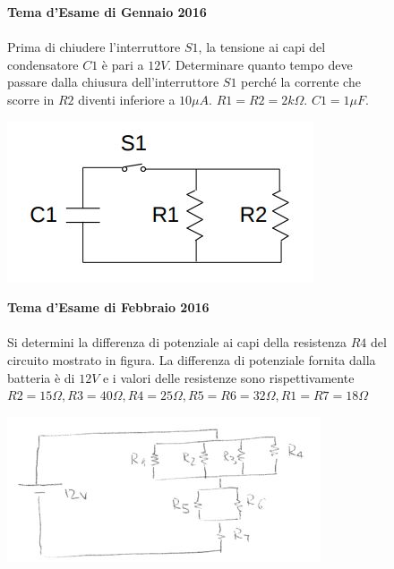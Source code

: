 \begin{figure}[h!]
\textbf{Tema d'Esame di Gennaio 2016}\\ \\
 Prima di chiudere l'interruttore $S1$, la tensione ai capi del condensatore $C1$ è pari a $12V$. Determinare quanto tempo deve passare dalla chiusura dell'interruttore $S1$ perché la corrente
che scorre in $R2$ diventi inferiore a $10 \mu A$. $R1=R2=2k\Omega$. $C1=1\mu F$.
\begin{center}
		\includegraphics[scale=0.8]{ES5/GEN052016.jpg}
	\end{center}
\end{figure}

\begin{figure}[h!]
\textbf{Tema d'Esame di Febbraio 2016}\\ \\
Si determini la differenza di potenziale ai capi della resistenza $R4$ del circuito mostrato in figura. La differenza di potenziale fornita dalla batteria è di $12V$ e i valori delle resistenze sono rispettivamente $R2=15\Omega, R3=40\Omega,R4=25\Omega, R5=R6=32\Omega, R1=R7=18\Omega$
\begin{center}
		\includegraphics[scale=1.1]{ES5/FEB052016.jpg}
	\end{center}
\end{figure}

